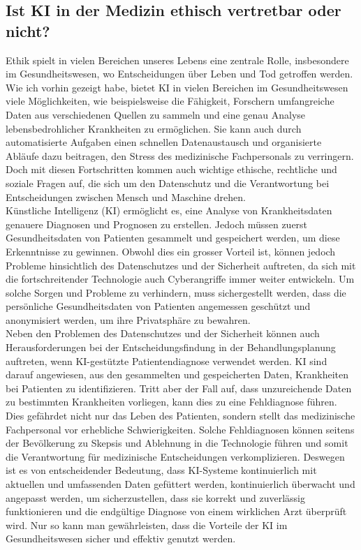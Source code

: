 \documentclass{report}
\begin{document}


\newpage
\subsection {Ist KI in der Medizin ethisch vertretbar oder nicht?}

Ethik spielt in vielen Bereichen unseres Lebens eine zentrale Rolle, insbesondere 
im Gesundheitswesen, wo Entscheidungen über Leben und Tod getroffen werden. 
Wie ich vorhin gezeigt habe, bietet KI in vielen Bereichen im Gesundheitswesen viele Möglichkeiten, wie beispielsweise
die Fähigkeit, Forschern umfangreiche Daten aus verschiedenen Quellen zu sammeln und eine
genau Analyse lebensbedrohlicher Krankheiten zu ermöglichen. Sie kann auch durch automatisierte Aufgaben einen schnellen 
Datenaustausch und organisierte Abläufe dazu beitragen, den Stress des medizinische Fachpersonals zu verringern.
Doch mit diesen Fortschritten kommen auch wichtige ethische, rechtliche und soziale 
Fragen auf, die sich um den Datenschutz und die Verantwortung bei Entscheidungen zwischen Mensch und Maschine drehen.
\\
Künstliche Intelligenz (KI) ermöglicht es, eine Analyse von Krankheitsdaten
genauere Diagnosen und Prognosen zu erstellen. Jedoch müssen zuerst Gesundheitsdaten von Patienten gesammelt und
gespeichert werden, um diese Erkenntnisse zu gewinnen. Obwohl dies ein grosser Vorteil ist, können jedoch Probleme
hinsichtlich des Datenschutzes und der Sicherheit auftreten, da sich mit die fortschreitender Technologie auch 
Cyberangriffe immer weiter entwickeln.\citep{clutch} Um solche Sorgen und Probleme zu verhindern, muss sichergestellt werden,
dass die persönliche Gesundheitsdaten von Patienten angemessen geschützt und anonymisiert werden, um ihre Privatsphäre 
zu bewahren.
\\
Neben den Problemen des Datenschutzes und der Sicherheit können auch Herausforderungen bei der Entscheidungsfindung in der Behandlungsplanung auftreten, wenn KI-gestützte
Patientendiagnose verwendet werden. KI sind darauf angewiesen, aus den gesammelten und gespeicherten Daten, 
Krankheiten bei Patienten zu identifizieren. Tritt aber der Fall auf, dass unzureichende Daten zu bestimmten Krankheiten 
vorliegen, kann dies zu eine Fehldiagnose führen. Dies gefährdet nicht nur das Leben des Patienten, sondern stellt das medizinische 
Fachpersonal vor erhebliche Schwierigkeiten. Solche Fehldiagnosen können seitens der Bevölkerung zu Skepsis und Ablehnung in die Technologie führen
und somit die Verantwortung für medizinische Entscheidungen verkomplizieren. Deswegen ist es von entscheidender Bedeutung, 
dass KI-Systeme kontinuierlich mit aktuellen und umfassenden Daten gefüttert werden, kontinuierlich überwacht und angepasst werden, um sicherzustellen, dass sie korrekt und zuverlässig funktionieren
und die endgültige Diagnose von einem wirklichen Arzt überprüft wird. Nur so kann man gewährleisten, dass die Vorteile
der KI im Gesundheitswesen sicher und effektiv genutzt werden. 
\end{document}

